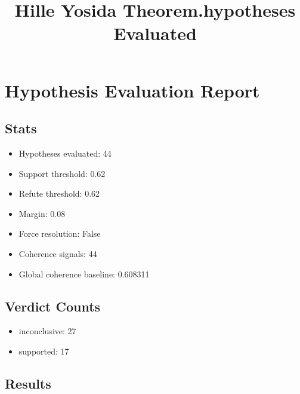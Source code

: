 \documentclass[
]{article}
\title{Hille Yosida Theorem.hypotheses Evaluated}
\author{}
\date{}
\providecommand{\tightlist}{%
  \setlength{\itemsep}{0pt}\setlength{\parskip}{0pt}}
\begin{document}
\maketitle

\section{Hypothesis Evaluation
Report}\label{hypothesis-evaluation-report}

\subsection{Stats}\label{stats}

\begin{itemize}
\tightlist
\item
  Hypotheses evaluated: 44
\item
  Support threshold: 0.62
\item
  Refute threshold: 0.62
\item
  Margin: 0.08
\item
  Force resolution: False
\item
  Coherence signals: 44
\item
  Global coherence baseline: 0.608311
\end{itemize}

\subsection{Verdict Counts}\label{verdict-counts}

\begin{itemize}
\tightlist
\item
  inconclusive: 27
\item
  supported: 17
\end{itemize}

\subsection{Results}\label{results}
\end{document}
